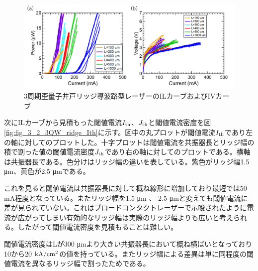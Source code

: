 {\begin{figure}[h]
	\centering
	\includegraphics[width=15cm]{figure/fig_3_2_3QW_ridge_IL.png}
		\caption{3周期歪量子井戸リッジ導波路型レーザーのILカーブおよびIVカーブ}
		\label{fig:fig_3_2_3QW_ridge_IL}
\end{figure}


次にILカーブから見積もった閾値電流$I_{\rm{th}}$、$J_{\rm{th}}$と閾値電流密度を図\ref{fig:fig_3_2_3QW_ridge_Ith}に示す。図中の丸プロットが閾値電流$I_{\rm{th}}$であり左の軸に対してのプロットした。十字プロットは閾値電流を共振器長とリッジ幅の積で割った値の閾値電流密度$J_{\rm{th}}$であり右の軸に対してのプロットである。横軸は共振器長である。色分けはリッジ幅の違いを表している。紫色がリッジ幅1.5 \si{\micro\metre}、黄色が2.5 \si{\micro\metre}である。

これを見ると閾値電流は共振器長に対して概ね線形に増加しており最短では50 mA程度となっている。またリッジ幅を1.5 \si{\micro\metre} 、 2.5 \si{\micro\metre}と変えても閾値電流に差が見られていない。これはブロードコンタクトレーザーで示唆されたように電流が広がってしまい有効的なリッジ幅は実際のリッジ幅よりも広いと考えられる。したがって閾値電流密度を見積もることは難しい。

閾値電流密度はLが300 \si{\micro\metre}より大きい共振器長において概ね横ばいとなっており10から20 $\rm{kA/cm^2}$の値を持っている。またリッジ幅による差異は単に同程度の閾値電流を異なるリッジ幅で割ったためである。


}
